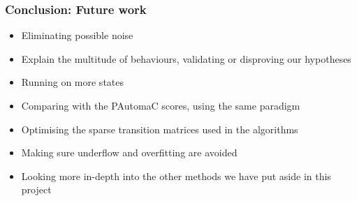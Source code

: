 \begin{frame}
  \frametitle{Conclusion: Future work}
  \begin{itemize}
  	\item Eliminating possible noise
  	\item Explain the multitude of behaviours, validating or disproving our hypotheses
  	\item Running on more states
  	\item Comparing with the PAutomaC scores, using the same paradigm
  	\item Optimising the sparse transition matrices used in the algorithms
  	\item Making sure underflow and overfitting are avoided
  	\item Looking more in-depth into the other methods we have put aside in this project
  \end{itemize}
\end{frame}
